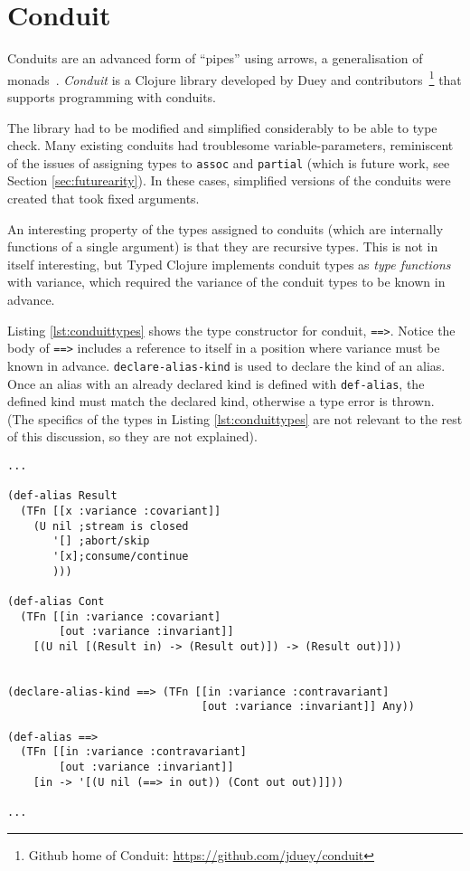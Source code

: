 \section{Conduit}

Conduits are an advanced form of ``pipes'' using arrows, a generalisation of monads~\cite{ConduitRef}.
\emph{Conduit} is a Clojure library developed by Duey and 
contributors~\footnote{Github home of Conduit: \url{https://github.com/jduey/conduit}} 
that supports programming with conduits.

The library had to be modified and simplified considerably to be able to type check.
Many existing conduits had troublesome variable-parameters, reminiscent of the
issues of assigning types to \lstinline|assoc| and \lstinline|partial|
(which is future work, see Section \ref{sec:futurearity}).
In these cases, simplified versions of the conduits were created that 
took fixed arguments.

An interesting property of the types assigned to conduits (which
are internally functions of a single argument) is that they are 
recursive types. This is not in itself interesting, but Typed Clojure
implements conduit types as \emph{type functions} with variance,
which required the variance of the conduit types to be known in advance.

Listing \ref{lst:conduittypes} shows the type constructor for conduit,
\lstinline|==>|. Notice the body of \lstinline|==>| includes a reference
to itself in a position where variance must be known in advance.
\lstinline|declare-alias-kind| is used to declare the kind of an alias.
Once an alias with an already declared kind is defined with \lstinline|def-alias|,
the defined kind must match the declared kind, otherwise a type error is thrown.
(The specifics of the types in Listing \ref{lst:conduittypes} are not relevant to the rest of this discussion,
so they are not explained).

\begin{lstlisting}[caption=Types for Conduits, label=lst:conduittypes]
...

(def-alias Result
  (TFn [[x :variance :covariant]]
    (U nil ;stream is closed
       '[] ;abort/skip
       '[x];consume/continue
       )))

(def-alias Cont
  (TFn [[in :variance :covariant]
        [out :variance :invariant]]
    [(U nil [(Result in) -> (Result out)]) -> (Result out)]))


(declare-alias-kind ==> (TFn [[in :variance :contravariant]
                              [out :variance :invariant]] Any))

(def-alias ==>
  (TFn [[in :variance :contravariant] 
        [out :variance :invariant]]
    [in -> '[(U nil (==> in out)) (Cont out out)]]))

...
\end{lstlisting}


